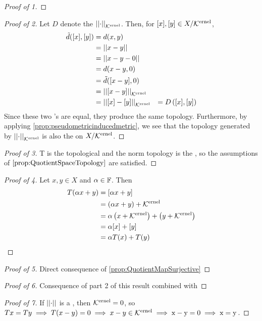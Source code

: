 \begin{prop}
\begin{enumerate}
\begin{proof}[Proof of 1]
\end{proof}
\begin{proof}[Proof of 2] 
Let $D$ denote the \SeminormInducedPseudometric $\left|\left| \cdot \right|\right|_{\bf\mathcal{K}\rm^{ernel}}$. 
Then, for $[x], [y] \in X/\bf\mathcal{K}\rm^{ernel}$, 
\begin{align*}
\tilde{d}([x], [y]) & = d(x,y)\\
& = \left|\left| x-y \right|\right|\\
& = \left|\left| x-y-0 \right|\right|\\
& = d(x-y, 0)\\
& = \tilde{d}([x-y],0)\\
& = \left|\left| [x-y] \right|\right|_{\bf\mathcal{K}\rm^{ernel}}\\
& = \left|\left| [x]-[y] \right|\right|_{\bf\mathcal{K}\rm^{ernel}}
& = D\left( [x], [y]\right)
\end{align*}
Since these two \Pseudometric's are equal, they produce the same topology. 
Furthermore, by applying \ref{prop:pseudometricinducedmetric}, we see that the 
topology generated by $\left|\left| \cdot \right|\right|_{\bf\mathcal{K}\rm^{ernel}}$ is also the \QuotientSpaceTopology on $X/\bf\mathcal{K}\rm^{ernel}$. 
\end{proof}
\begin{proof}[Proof of 3]
T is the topological \QuotientMap and the norm topology is the \QuotientSpaceTopology, so the assumptions of $\ref{prop:QuotientSpaceTopology}$ are satisfied. 
\end{proof} 
\begin{proof}[Proof of 4] 
Let $x,y \in X$ and $\alpha \in \mathbb{F}$. Then 
\begin{align*}
T(\alpha x + y) & = [\alpha x + y] \\
& = (\alpha x + y ) + \bf\mathcal{K}\rm^{ernel}\\
& =\alpha \left( x+\bf\mathcal{K}\rm^{ernel}\right) + \left( y+ \bf\mathcal{K}\rm^{ernel}\right)\\
& = \alpha [x] + [y]\\
& = \alpha T(x) + T(y) 
\end{align*}
\end{proof}
\begin{proof}[Proof of 5] 
Direct consequence of \ref{prop:QuotientMapSurjective}
\end{proof}
\begin{proof}[Proof of 6] 
Consequence of part 2 of this result combined with 
\end{proof}
\begin{proof}[Proof of 7] 
If $\left|\left| \cdot \right|\right|$ is a \Norm, then $\bf\mathcal{K}\rm^{ernel}={0}$, so 
$Tx=Ty \implies T(x-y) =0 \implies x-y \in \bf\mathcal{K}\rm^{ernel} \implies x-y=0 \implies x=y$. 
\end{proof}

\end{enumerate} 

\end{prop} 
